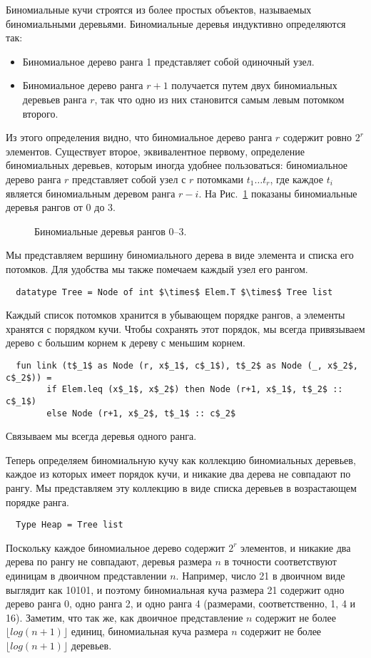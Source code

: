 Биномиальные кучи строятся из более простых объектов, называемых
биномиальными деревьями. Биномиальные деревья индуктивно определяются
так:
\begin{itemize}
\item Биномиальное дерево ранга 1 представляет собой одиночный узел.
\item Биномиальное дерево ранга $r+1$ получается путем
   двух биномиальных деревьев ранга $r$, так
  что одно из них становится самым левым потомком второго.
\end{itemize}
Из этого определения видно, что биномиальное дерево ранга $r$ содержит
ровно $2^r$ элементов.  Существует второе, эквивалентное первому,
определение биномиальных деревьев, которым иногда удобнее
пользоваться: биномиальное дерево ранга $r$ представляет собой узел
с $r$ потомками $t_1\ldots t_r$, где каждое $t_i$ является
биномиальным деревом ранга $r-i$.  На Рис.~\ref{fig:3.3} показаны
биномиальные деревья рангов от 0 до 3.

\begin{figure}
  \centering
  
  \caption{Биномиальные деревья рангов 0--3.}
  \label{fig:3.3}
\end{figure}

Мы представляем вершину биномиального дерева в виде элемента и списка
его потомков. Для удобства мы также помечаем каждый узел его рангом.
\begin{lstlisting}
  datatype Tree = Node of int $\times$ Elem.T $\times$ Tree list
\end{lstlisting}
Каждый список потомков хранится в убывающем порядке рангов, а элементы
хранятся с порядком кучи.  Чтобы сохранять этот порядок, мы всегда
привязываем дерево с большим корнем к дереву с меньшим корнем.
\begin{lstlisting}
  fun link (t$_1$ as Node (r, x$_1$, c$_1$), t$_2$ as Node (_, x$_2$, c$_2$)) =
        if Elem.leq (x$_1$, x$_2$) then Node (r+1, x$_1$, t$_2$ :: c$_1$)
        else Node (r+1, x$_2$, t$_1$ :: c$_2$
\end{lstlisting}
Связываем мы всегда деревья одного ранга.

Теперь определяем биномиальную кучу как коллекцию биномиальных
деревьев, каждое из которых имеет порядок кучи, и никакие два дерева
не совпадают по рангу. Мы представляем эту коллекцию в виде списка
деревьев в возрастающем порядке ранга.
\begin{lstlisting}
  Type Heap = Tree list
\end{lstlisting}
Поскольку каждое биномиальное дерево содержит $2^r$ элементов, и
никакие два дерева по рангу не совпадают, деревья размера $n$ в
точности соответствуют единицам в двоичном представлении
$n$. Например, число 21 в двоичном виде выглядит как 10101, и поэтому
биномиальная куча размера 21 содержит одно дерево ранга 0, одно ранга
2, и одно ранга 4 (размерами, соответственно, 1, 4 и 16). Заметим, что
так же, как двоичное представление $n$ содержит не более $\lfloor log
(n+1)\rfloor$ единиц, биномиальная куча размера $n$ содержит не более
$\lfloor log(n+1) \rfloor$ деревьев.


